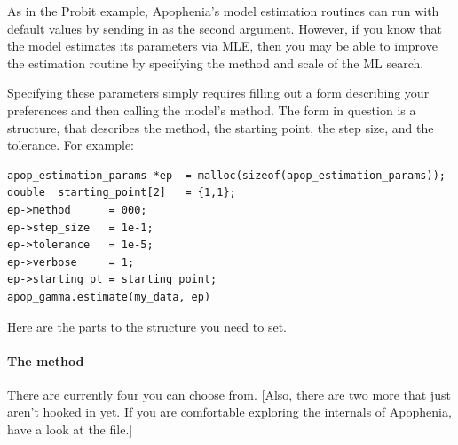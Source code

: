 As in the Probit example, Apophenia's model estimation routines can run
with default values by sending in  as the second
argument. However, if you know that the model estimates its parameters
via MLE, then you may be able to improve the estimation routine by
specifying the method and scale of the ML search.

Specifying these parameters simply requires 
filling out a form describing your preferences and then calling the model's  method.
The form in question is a  structure, that
describes the method, the starting point, the step size, and the
tolerance.
For example:
\begin{lstlisting}
apop_estimation_params *ep  = malloc(sizeof(apop_estimation_params));
double  starting_point[2]   = {1,1};
ep->method      = 000;
ep->step_size   = 1e-1;
ep->tolerance   = 1e-5;
ep->verbose     = 1;
ep->starting_pt = starting_point;
apop_gamma.estimate(my_data, ep)
\end{lstlisting}

Here are the parts to the  
structure you need to set. 

\paragraph{The method} There are currently four you can choose from.
[Also, there are two more that  just aren't hooked in yet. If you are
comfortable exploring the internals of Apophenia, have a look at the
 file.]


